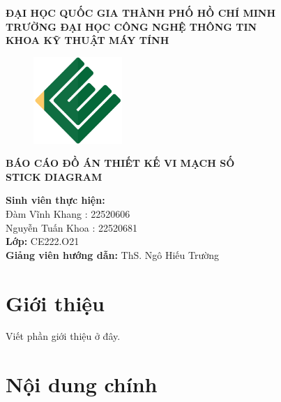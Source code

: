 \documentclass[a4paper,12pt]{article}
\begin{document}
\begin{center}
\textbf{ĐẠI HỌC QUỐC GIA THÀNH PHỐ HỒ CHÍ MINH}\\
\textbf{TRƯỜNG ĐẠI HỌC CÔNG NGHỆ THÔNG TIN}\\
\textbf{KHOA KỸ THUẬT MÁY TÍNH}\\[1cm]

\begin{figure}[H]
    \centering
    \includegraphics[width=0.3\textwidth]{../PNG/CE.png}
    \label{fig:LOGO_CE}\\
\end{figure}

\textbf{\Large BÁO CÁO ĐỒ ÁN THIẾT KẾ VI MẠCH SỐ}\\
\textbf{\Large STICK DIAGRAM}\\[2cm]

\begin{flushleft}
\textbf{Sinh viên thực hiện:} \\
Đàm Vĩnh Khang : 22520606 \\
Nguyễn Tuấn Khoa : 22520681\\[0.5cm]

\textbf{Lớp:} CE222.O21\\
\textbf{Giảng viên hướng dẫn:} ThS. Ngô Hiếu Trường\\[1cm]

\end{flushleft}
\end{center}

\newpage

\tableofcontents
\newpage


\section{Giới thiệu}
Viết phần giới thiệu ở đây.

\section{Nội dung chính}
\end{document}

